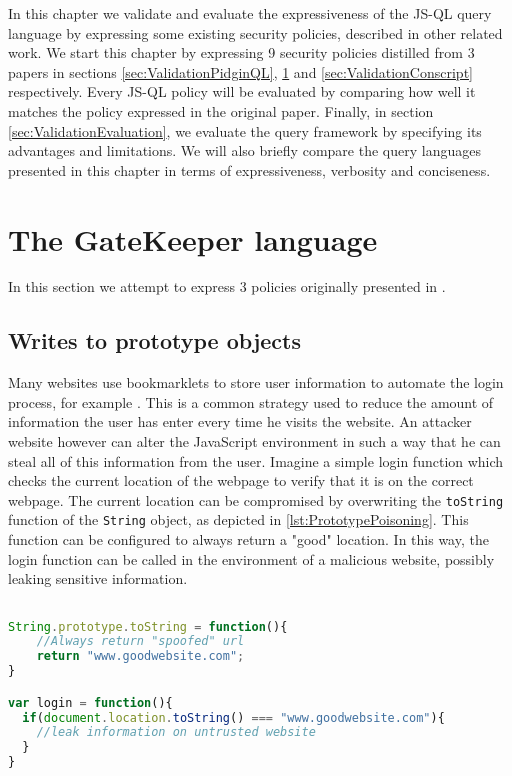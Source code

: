 In this chapter we validate and evaluate the expressiveness of the JS-QL query language by expressing some existing security policies, described in other related work. 
We start this chapter by expressing 9 security policies distilled from 3 papers in sections \ref{sec:ValidationPidginQL}, \ref{sec:ValidationGK} and \ref{sec:ValidationConscript} respectively. Every JS-QL policy will be evaluated by comparing how well it matches the policy expressed in the original paper. Finally, in section \ref{sec:ValidationEvaluation}, we evaluate the query framework by specifying its advantages and limitations. We will also briefly compare the query languages presented in this chapter in terms of expressiveness, verbosity and conciseness.
\section{The GateKeeper language}
\label{sec:ValidationGK}

In this section we attempt to express 3 policies originally presented in \cite{GateKeeper}.

\subsection{Writes to prototype objects}

Many websites use bookmarklets to store user information to automate the login process, for example \cite{PrototypePoisoning}. This is a common strategy used to reduce the amount of information the user has enter every time he visits the website. An attacker website however can alter the JavaScript environment in such a way that he can steal all of this information from the user. Imagine a simple login function which checks the current location of the webpage to verify that it is on the correct webpage. The current location can be compromised by overwriting the \texttt{toString} function of the \texttt{String} object, as depicted in \ref{lst:PrototypePoisoning}. This function can be configured to always return a "good" location. In this way, the login function can be called in the environment of a malicious website, possibly leaking sensitive information.

\begin{lstlisting}[label={lst:PrototypePoisoning},language=JavaScript,caption=Prototype poisoning example,mathescape=true]  % float=t?

String.prototype.toString = function(){
    //Always return "spoofed" url
    return "www.goodwebsite.com";
}

var login = function(){
  if(document.location.toString() === "www.goodwebsite.com"){
    //leak information on untrusted website
  }
}
\end{lstlisting}

